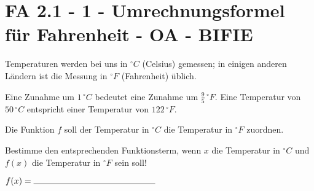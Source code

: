 \section{FA 2.1 - 1 - Umrechnungsformel für Fahrenheit - OA - BIFIE}

\begin{beispiel}[FA 2.1]{1} %
Temperaturen werden bei uns in $^\circ C$ (Celsius) gemessen; in einigen anderen Ländern ist die Messung in $^\circ F$ (Fahrenheit) üblich.

Eine Zunahme um $1\,^\circ C$ bedeutet eine Zunahme um $\frac{9}{5}\,^\circ F$.
Eine Temperatur von $50\,^\circ C$ entspricht einer Temperatur von $122\,^\circ F$.

Die Funktion $f$ soll der Temperatur in $^\circ C$ die Temperatur in $^\circ F$ zuordnen.

Bestimme den entsprechenden Funktionsterm, wenn $x$ die Temperatur in $^\circ C$ und $f(x)$ die Temperatur in $^\circ F$ sein soll!
\leer

$f(x)=\rule{5cm}{0.3pt}$
\leer

\end{beispiel}